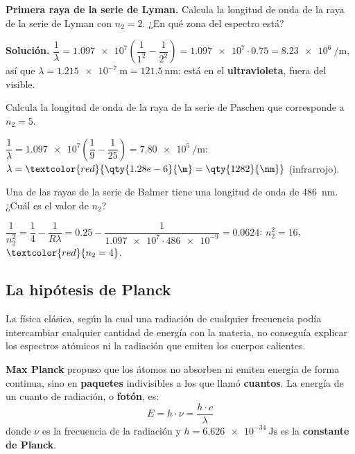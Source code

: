\begin{example}
    \textbf{Primera raya de la serie de Lyman.} Calcula la longitud de onda de la raya de la serie de Lyman con \(n_2 = 2\). ¿En
    qué zona del espectro está?

    \textbf{Solución.} \(\dfrac{1}{\lambda} = \num{1.097e7} \left( \dfrac{1}{1^2} - \dfrac{1}{2^2} \right) = \num{1.097e7} \cdot
    \num{0.75} = \qty{8.23e6}{\per\m}\), así que \(\lambda = \qty{1.215e-7}{\m} = \qty{121.5}{\nm}\): está en el
    \textbf{ultravioleta}, fuera del visible.
\end{example}

\begin{exercise}
    Calcula la longitud de onda de la raya de la serie de Paschen que corresponde a \(n_2 = 5\).
    \begin{solu}
        \(\dfrac{1}{\lambda} = \num{1.097e7} \left( \dfrac{1}{9} - \dfrac{1}{25} \right) = \qty{7.80e5}{\per\m}\):
        \(\lambda = \textcolor{red}{\qty{1.28e-6}{\m} = \qty{1282}{\nm}}\) (infrarrojo).
    \end{solu}
\end{exercise}

\begin{exercise}
    Una de las rayas de la serie de Balmer tiene una longitud de onda de \qty{486}{\nm}. ¿Cuál es el valor de \(n_2\)?
    \begin{solu}
        \(\dfrac{1}{n_2^2} = \dfrac{1}{4} - \dfrac{1}{R \lambda} = \num{0.25} - \dfrac{1}{\num{1.097e7} \cdot \num{486e-9}} = \num{0.0624}\):
        \(n_2^2 = 16\), \(\textcolor{red}{n_2 = 4}\).
    \end{solu}
\end{exercise}

\subsection{La hipótesis de Planck}

La física clásica, según la cual una radiación de cualquier frecuencia podía intercambiar cualquier cantidad de energía con la
materia, no conseguía explicar los espectros atómicos ni la radiación que emiten los cuerpos calientes.

\begin{definition}
    \textbf{Max Planck} propuso que los átomos no absorben ni emiten energía de forma continua, sino en \textbf{paquetes}
    indivisibles a los que llamó \textbf{cuantos}. La energía de un cuanto de radiación, o \textbf{fotón}, es:
    \[ E = h \cdot \nu = \frac{h \cdot c}{\lambda} \]
    donde \(\nu\) es la frecuencia de la radiación y \(h = \qty{6.626e-34}{\joule\s}\) es la \textbf{constante de Planck}.
\end{definition}


